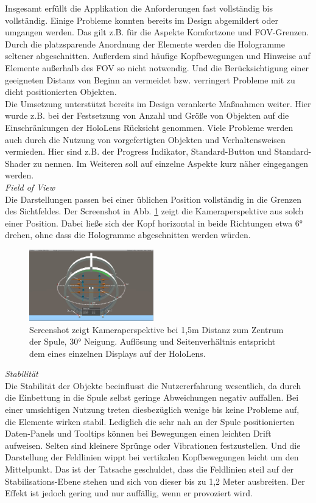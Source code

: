 Insgesamt erfüllt die Applikation die Anforderungen fast vollständig bis vollständig. Einige Probleme konnten bereits im Design abgemildert oder umgangen werden. Das gilt z.B. für die Aspekte Komfortzone und FOV-Grenzen. Durch die platzsparende Anordnung der Elemente werden die Hologramme seltener abgeschnitten. Außerdem sind häufige Kopfbewegungen und Hinweise auf Elemente außerhalb des FOV so nicht notwendig. Und die Berücksichtigung einer geeigneten Distanz von Beginn an vermeidet bzw. verringert Probleme mit zu dicht positionierten Objekten.\\

Die Umsetzung unterstützt bereits im Design verankerte Maßnahmen weiter. Hier wurde z.B. bei der Festsetzung von Anzahl und Größe von Objekten auf die Einschränkungen der HoloLens Rücksicht genommen. Viele Probleme werden auch durch die Nutzung von vorgefertigten Objekten und Verhaltensweisen vermieden. Hier sind z.B. der Progress Indikator, Standard-Button und Standard-Shader zu nennen. Im Weiteren soll auf einzelne Aspekte kurz näher eingegangen werden.\\

\textit{Field of View}\\
Die Darstellungen passen bei einer üblichen Position vollständig in die Grenzen des Sichtfeldes. Der Screenshot in Abb. \ref{img:fov} zeigt die Kameraperspektive aus solch einer Position. Dabei ließe sich der Kopf horizontal in beide Richtungen etwa 6° drehen, ohne dass die Hologramme abgeschnitten werden würden.
\begin{figure}
	\centering
	\includegraphics[width=0.48\textwidth]{images/unity/fov.jpg}
	\caption{Screenshot zeigt Kameraperspektive bei 1,5m Distanz zum Zentrum der Spule, 30° Neigung. Auflösung und Seitenverhältnis entspricht dem eines einzelnen Displays auf der HoloLens.}
	\label{img:fov}
\end{figure}

\textit{Stabilität}\\
Die Stabilität der Objekte beeinflusst die Nutzererfahrung wesentlich, da durch die Einbettung in die Spule selbst geringe Abweichungen negativ auffallen. Bei einer umsichtigen Nutzung treten diesbezüglich wenige bis keine Probleme auf, die Elemente wirken stabil. Lediglich die sehr nah an der Spule positionierten Daten-Panels und Tooltips können bei Bewegungen einen leichten Drift aufweisen. Selten sind kleinere Sprünge oder Vibrationen festzustellen. Und die Darstellung der Feldlinien wippt bei vertikalen Kopfbewegungen leicht um den Mittelpunkt. Das ist der Tatsache geschuldet, dass die Feldlinien steil auf der Stabilisations-Ebene stehen und sich von dieser bis zu 1,2 Meter ausbreiten. Der Effekt ist jedoch gering und nur auffällig, wenn er provoziert wird.\\

